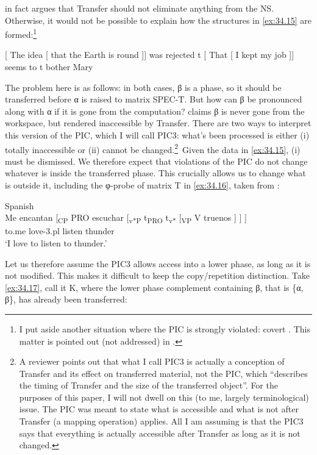 \documentclass[output=paper]{langsci/langscibook}
\begin{document}
\largerpage
\citet{Chomsky2016} in fact argues that Transfer should not eliminate anything
from the \gls{NS}. Otherwise, it would not be possible to explain how the
structures in \eqref{ex:34.15} are formed:\footnote{I put aside another situation where the
    \gls{PIC} is strongly violated: covert . This matter is pointed out
(not addressed) in \textcites[111]{Chomsky2004}[13]{Chomsky2005}.}

\ea%
    \label{ex:34.15}
    \ea {}[ The idea [ that the Earth is round ]] was rejected t
    \ex {}[ That [ I kept my job ]] seems to t bother Mary
	\z
\z

The problem here is as follows: in both cases, β is a phase, so it should be
transferred before α is raised to matrix SPEC-T. But how can β be pronounced
along with α if it is gone from the computation? \citet{Chomsky2016} claims β
is never gone from the workspace, but rendered inaccessible by Transfer. There
are two ways to interpret this version of the \gls{PIC}, which I will call PIC3:
what’s been processed is either (i) totally inaccessible or (ii) cannot be
changed.\footnote{A reviewer points out that what I call PIC3 is actually a
    conception of Transfer and its effect on transferred material, not the \gls{PIC},
    which “describes the timing of Transfer and the size of the transferred
    object”. For the purposes of this paper, I will not dwell on this (to me,
    largely terminological) issue. The \gls{PIC} was meant to state what is
    accessible and what is not after Transfer (a mapping operation) applies.
    All I am assuming is that the PIC3 says that everything is actually
accessible after Transfer as long as it is not changed.}~Given the data in
\eqref{ex:34.15}, (i) must be dismissed. We therefore expect that violations of the
\gls{PIC} do not change whatever is inside the transferred phase. This
crucially allows us to change what is outside it, including the φ-probe of
matrix T in \eqref{ex:34.16}, taken from \citet{Fernandez-Serrano2016}:

\ea%
    \label{ex:34.16}Spanish\\
    \gll Me encantan [\textsubscript{CP} PRO escuchar [\textsubscript{v*P} t\textsubscript{PRO} t\textsubscript{v*} [\textsubscript{VP} V  truenos ] ] ]\\
        to.me love-3.pl {} {} listen {} {} {} {} {} thunder\\
    \glt ‘I love to listen to thunder.’
\z

Let us therefore assume the PIC3 allows access into a lower phase, as long as
it is not modified. This makes it difficult to keep the copy\slash repetition
distinction. Take \eqref{ex:34.17}, call it K, where the lower phase complement containing
β, that is \{α, β\}, has already been transferred:
\end{document}
